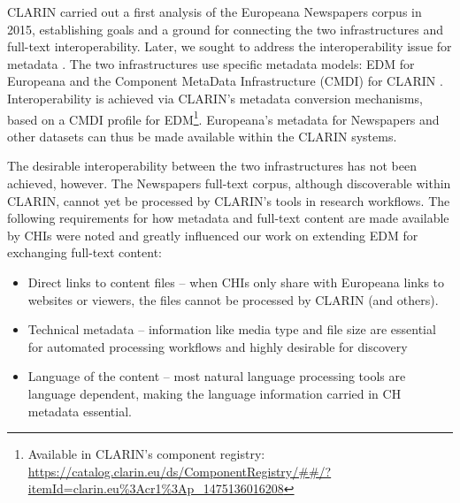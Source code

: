 \documentclass[a4paper,UKenglish,cleveref, autoref]{oasics-v2019}
\begin{document}
CLARIN carried out a first analysis of the Europeana Newspapers corpus in 2015, establishing goals and a ground for connecting the two infrastructures and full-text interoperability. Later, we sought to address the interoperability issue for metadata \cite{Goosen17}. The two infrastructures use specific metadata models: EDM for Europeana and the Component MetaData Infrastructure (CMDI) for CLARIN \cite{cmdi}. Interoperability is achieved via CLARIN's metadata conversion mechanisms, based on a CMDI profile for 
EDM\footnote{Available in CLARIN’s component registry:  \url{https://catalog.clarin.eu/ds/ComponentRegistry/##/?itemId=clarin.eu\%3Acr1\%3Ap_1475136016208}}.
Europeana's metadata for Newspapers and other datasets can thus be made available within the CLARIN systems. 

The desirable interoperability between the two infrastructures has not been achieved, however. The Newspapers full-text corpus, although discoverable within CLARIN, cannot yet be processed by CLARIN's tools in research workflows. The following requirements for how metadata and full-text content are made available by CHIs were noted and greatly influenced our work on extending EDM for exchanging full-text content:
\begin{itemize}
\item Direct links to content files – when CHIs only share with Europeana links to websites or viewers, the files cannot be processed by CLARIN (and others).
\item Technical metadata – information like media type and file size are essential for automated processing workflows and highly desirable for discovery
\item Language of the content – most natural language processing tools are language dependent, making the language information carried in CH metadata essential.
\end{itemize}
\end{document}

